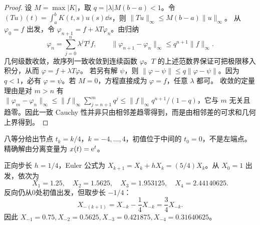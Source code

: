 \begin{proof}
设 $M=\max|K|$，取 $q=|\lambda|M(b-a)<1$。令 $(Tu)(t)=\displaystyle\int_a^bK(t,s)u(s)\dd s$，则 $\|Tu\|_\infty\le M(b-a)\|u\|_\infty$。
从 $\varphi_0=f$ 出发，令 $\varphi_{n+1}=f+\lambda T\varphi_n$。由归纳
\[
 \varphi_n=\sum_{j=0}^n\lambda^jT^jf,\qquad
 \|\varphi_{n+1}-\varphi_n\|_\infty\le q^{n+1}\|f\|_\infty.
\]
几何级数收敛，故序列一致收敛到连续函数 $\varphi$。$T$ 的上述范数界保证可把极限移入积分，从而 $\varphi=f+\lambda T\varphi$。
若另有解 $\psi$，则 $\|\varphi-\psi\|\le q\|\varphi-\psi\|$。因为 $q<1$，必有 $\varphi=\psi$。若 $M=0$，方程直接成为 $\varphi=f$，任意 $\lambda$ 都可。
收敛的定量理由是对 $m>n$ 有 $\|\varphi_m-\varphi_n\|_\infty\le\|f\|_\infty\sum_{j=n+1}^mq^j\le\|f\|_\infty q^{n+1}/(1-q)$，它与 $m$ 无关且趋零。因此一致 Cauchy 性并非只由相邻差趋零得到，而是由相邻差的可求和几何上界得到。
\end{proof}
八等分给出节点 $t_k=k/4$，$k=-4,\ldots,4$，初值位于中间的 $t_0=0$，不是左端点。精确解由分离变量为 $x(t)=\mathrm e^t$。

正向步长 $h=1/4$，Euler 公式为 $X_{k+1}=X_k+hX_k=(5/4)X_k$。从 $X_0=1$ 出发，依次为
\[
X_1=1.25,\quad X_2=1.5625,\quad X_3=1.953125,\quad X_4=2.44140625.
\]
反向仍从0处初值出发，但取步长 $-1/4$：
\[
X_{-(k+1)}=X_{-k}-\dfrac14X_{-k}=\dfrac34X_{-k}.
\]
因此 $X_{-1}=0.75,X_{-2}=0.5625,X_{-3}=0.421875,X_{-4}=0.31640625$。

